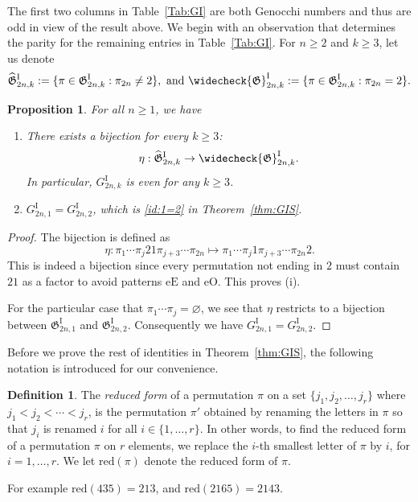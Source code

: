 \documentclass[11pt,reqno]{amsart}
\numberwithin{equation}{section}
\theoremstyle{plain}
\newtheorem{proposition}[theorem]{Proposition}
\theoremstyle{definition}
\newtheorem{Def}[theorem]{Definition}
\newcommand{\fG}{\mathfrak{G}}
\newcommand{\GI}{\fG^{\mathrm{I}}}
\newcommand{\tGI}{\widehat{\fG}^{\mathrm{I}}}
\newcommand{\cGI}{\widecheck{\fG}^{\mathrm{I}}}
\newcommand{\Gi}{G^{\mathrm{I}}}
\def\eE{\mathrm{eE}}
\def\eO{\mathrm{eO}}
\def\re{\mathrm{red}}
\begin{document}
The first two columns in Table~\ref{Tab:GI} are both Genocchi numbers and thus are odd in view of the result above. We begin with an observation that determines the parity for the remaining entries in Table~\ref{Tab:GI}. For $n\ge 2$ and $k\ge 3$, let us denote
\begin{align}
	\tGI_{2n,k}:=\{\pi\in\GI_{2n,k}:\pi_{2n}\neq 2\}, \text{ and }\cGI_{2n,k}:=\{\pi\in\GI_{2n,k}:\pi_{2n}=2\}. \label{bisection}
\end{align}

\begin{proposition}\label{prop:div}
	For all $n\ge 1$, we have 
	\begin{enumerate}[label=(\roman*)]
		\item There exists a bijection for every $k\ge 3$: 
		$$\eta : \tGI_{2n,k} \to \cGI_{2n,k}.$$ 
		In particular, $\Gi_{2n,k}$ is even for any $k\ge 3$.
		\item $\Gi_{2n,1}=\Gi_{2n,2}$, which is \eqref{id:1=2} in Theorem~\ref{thm:GIS}.
	\end{enumerate}
\end{proposition}

\begin{proof}
	The bijection is defined as $$\eta: \pi_1\cdots \pi_j 21 \pi_{j+3}\cdots \pi_{2n}\mapsto \pi_1\cdots \pi_j 1 \pi_{j+3}\cdots \pi_{2n}2.$$
	This is indeed a bijection since every permutation not ending in $2$ must contain $21$ as a factor to avoid patterns $\eE$ and $\eO$. This proves (i).

	For the particular case that $\pi_1\cdots \pi_j=\varnothing$, we see that $\eta$ restricts to a bijection between $\GI_{2n,1}$ and $\GI_{2n,2}$. Consequently we have $\Gi_{2n,1}=\Gi_{2n,2}$.
\end{proof}




Before we prove the rest of identities in Theorem~\ref{thm:GIS}, the following notation is introduced for our convenience.
\begin{Def}{\cite[Definition~1.0.9]{kit11}}
	The {\it reduced form} of a permutation $\pi$ on a set $\{j_1,j_2,\ldots,j_r\}$ where
	$j_1<j_2<\cdots<j_r$, is the permutation $\pi'$ obtained by renaming the letters in $\pi$ so that $j_i$ is renamed $i$ for all $i\in \{1,\ldots,r\}$. In other words, to find the reduced form of a permutation $\pi$ on $r$ elements, we replace the $i$-th smallest letter of $\pi$ by $i$, for $i=1,\ldots,r$. We let $\re(\pi)$ denote the reduced form of $\pi$.
\end{Def}
For example $\re(435)=213$, and $\re(2165)=2143$.
\end{document}
